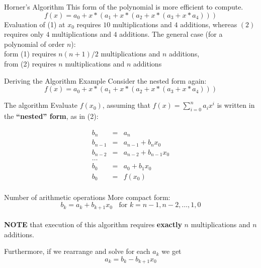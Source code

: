 \documentclass[12pt]{beamer}
\begin{document}
\begin{frame}{Horner's Algorithm} 
This form of the polynomial is more efficient to compute. 
\begin{equation} 
f(x) = a_0 + x * (a_1 + x * ( a_2 + x * (a_3 + x * a_4)))
\end{equation} 
\noindent 
Evaluation of (1) at $x_0$ requires $10$ multiplications and $4$ additions, whereas $(2)$ requires only $4$ multiplications and $4$ additions. 
\noindent 
The general case (for a polynomial of order $n$): \\
form (1) requires $n(n+1)/2$ multiplications and $n$ additions, \\ 
from (2) requires $n$ multiplications and $n$ additions 
\\
\end{frame} 

\begin{frame}{Deriving the Algorithm Example} 
Consider the nested form again: 
\begin{equation*} 
f(x) = a_0 + x * (a_1 + x * ( a_2 + x * (a_3 + x * a_4)))
\end{equation*}
\vspace{3 in}
\end{frame} 

\begin{frame}{The algorithm} 
Evaluate $f(x_0)$, assuming that $f(x) = \sum_{i=0}^{n} a_ix^i$ is written in the {\bf ``nested'' form}, as in (2): 

\begin{eqnarray*} 
b_n &=& a_n \\ 
b_{n-1} &=& a_{n-1} + b_{n} x_0 \\ 
b_{n-2} &=& a_{n-2} + b_{n-1} x_0 \\ 
\dots \\ 
b_{0} &=& a_{0} + b_{1} x_0 \\ 
b_0 &=& f(x_0) \\ 
\end{eqnarray*} 
\end{frame} 

\begin{frame}{Number of arithmetic operations} 
More compact form: 
\[
b_k = a_k + b_{k+1} x_0 \;\; \mbox{ for } k = n-1, n-2, \dots, 1, 0  
\]
\\
{\bf NOTE} that execution of this algorithm requires {\bf exactly} $n$ multiplications and $n$ additions. 

Furthermore, if we rearrange and solve for each $a_k$ we get
\[
a_k = b_k - b_{k+1}x_0
\]
\end{frame} 
\end{document}
